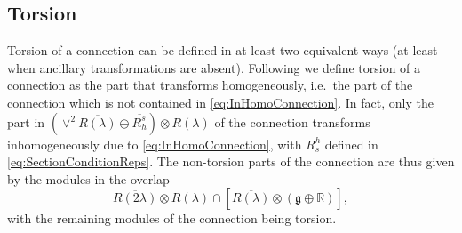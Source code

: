 \subsection{Torsion}\label{sec:TorsionSubSec}
Torsion of a connection can be defined in at least two equivalent ways (at least when ancillary transformations are absent). Following \cite{Cederwall:2013naa} we define torsion of a connection as the part that transforms homogeneously, i.e.\ the part of the connection which is not contained in \eqref{eq:InHomoConnection}. In fact, only the part in $\left(\vee^2\overbar{R(\lambda)}\ominus \overbar{R_h^s}\right)\otimes R(\lambda)$ of the connection transforms inhomogeneously due to \eqref{eq:InHomoConnection}, with $R_s^h$ defined in \eqref{eq:SectionConditionReps}. The non-torsion parts of the connection are thus given by the modules in the overlap 
\begin{equation}
    \overbar{R(2\lambda)}\otimes R(\lambda) \cap \left[\overbar{R(\lambda)}\otimes \left(\mathfrak{g}\oplus \mathbb{R}\right)\right],
\end{equation}
with the remaining modules of the connection being torsion. 

